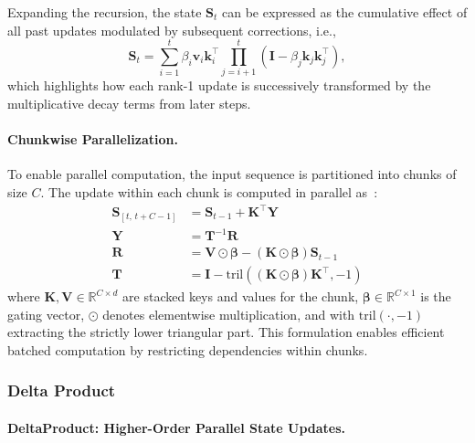 \documentclass[10pt,a4paper]{article}
\begin{document}
Expanding the recursion, the state $\mathbf{S}_t$ can be expressed as the cumulative effect of all past updates modulated by subsequent corrections, i.e.,
\begin{equation}
    \mathbf{S}_t = \sum_{i=1}^t \beta_i \mathbf{v}_i \mathbf{k}_i^\top \prod_{j=i+1}^t \left( \mathbf{I} - \beta_j \mathbf{k}_j \mathbf{k}_j^\top \right),
\end{equation}
which highlights how each rank-1 update is successively transformed by the multiplicative decay terms from later steps.

\paragraph{Chunkwise Parallelization.}

To enable parallel computation, the input sequence is partitioned into chunks of size $C$. The update within each chunk is computed in parallel as~\cite{yang2024parallelizing}:
\begin{align}
    \mathbf{S}_{[t,\,t+C-1]} &= \mathbf{S}_{t-1} + \mathbf{K}^\top \mathbf{Y} \\
    \mathbf{Y} &= \mathbf{T}^{-1} \mathbf{R} \\
    \mathbf{R} &= \mathbf{V} \odot \boldsymbol{\beta} - (\mathbf{K} \odot \boldsymbol{\beta}) \mathbf{S}_{t-1} \\ 
    \mathbf{T} &= \mathbf{I} - \mathrm{tril}\left((\mathbf{K} \odot \boldsymbol{\beta}) \mathbf{K}^\top, -1\right)
\end{align}
where $\mathbf{K}, \mathbf{V} \in \mathbb{R}^{C \times d}$ are stacked keys and values for the chunk, $\boldsymbol{\beta} \in \mathbb{R}^{C \times 1}$ is the gating vector, $\odot$ denotes elementwise multiplication, and with $\mathrm{tril}(\cdot, -1)$ extracting the strictly lower triangular part. This formulation enables efficient batched computation by restricting dependencies within chunks.


\subsubsection{Delta Product}


\paragraph{DeltaProduct: Higher-Order Parallel State Updates.}
\end{document}
